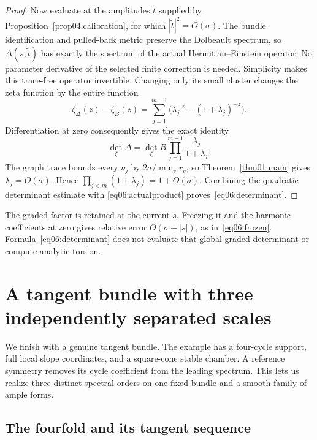\documentclass[11pt]{amsart}
\theoremstyle{definition}
\theoremstyle{remark}
\begin{document}
\begin{proof}
Now evaluate at the amplitudes \(\widetilde t\) supplied by
Proposition~\ref{prop04:calibration}, for which
\(|\widetilde t|^2=O(\sigma)\). The bundle identification and
pulled-back metric preserve the Dolbeault spectrum, so
\(\Delta(s,\widetilde t)\) has exactly the spectrum of the
actual Hermitian--Einstein operator. No parameter derivative of
the selected finite correction is needed. Simplicity makes this
trace-free operator invertible. Changing only its small cluster
changes the zeta function by the entire function
\[
 \zeta_\Delta(z)-\zeta_B(z)
 =\sum_{j=1}^{m-1}
       \bigl(\lambda_j^{-z}-(1+\lambda_j)^{-z}\bigr).
\]
Differentiation at zero consequently gives the exact identity
\[
 \det_\zeta\Delta
 =\det_\zeta B\prod_{j=1}^{m-1}\frac{\lambda_j}{1+\lambda_j}.
\]
The graph trace bounds every \(\nu_j\) by
\(2\sigma/\min_vr_v\), so Theorem~\ref{thm01:main} gives
\(\lambda_j=O(\sigma)\). Hence
\(\prod_{j<m}(1+\lambda_j)=1+O(\sigma)\).
Combining the quadratic determinant estimate with
\eqref{eq06:actualproduct} proves~\eqref{eq06:determinant}.
\end{proof}

The graded factor is retained at the current \(s\). Freezing it
and the harmonic coefficients at zero gives relative error
\(O(\sigma+|s|)\), as in~\eqref{eq06:frozen}.
Formula~\eqref{eq06:determinant} does not evaluate that global
graded determinant or compute analytic torsion.

\section{A tangent bundle with three independently separated scales}
\label{sec07:geometry}

We finish with a genuine tangent bundle. The example has a four-cycle
support, full local slope coordinates, and a square-cone stable
chamber. A reference symmetry removes its cycle coefficient from
the leading spectrum. This lets us realize three distinct spectral
orders on one fixed bundle and a smooth family of ample forms.

\subsection{The fourfold and its tangent sequence}
\end{document}

